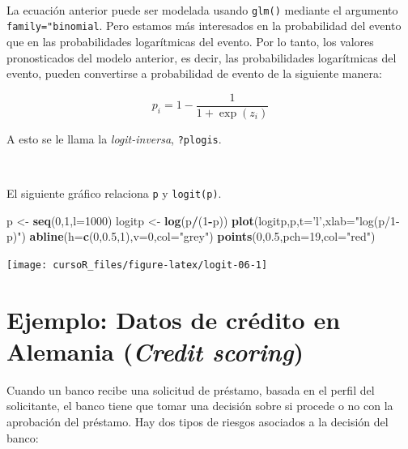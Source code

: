 \documentclass[]{book}
\newenvironment{Shaded}{\begin{snugshade}}{\end{snugshade}}
\newcommand{\KeywordTok}[1]{\textcolor[rgb]{0.13,0.29,0.53}{\textbf{#1}}}
\newcommand{\DataTypeTok}[1]{\textcolor[rgb]{0.13,0.29,0.53}{#1}}
\newcommand{\DecValTok}[1]{\textcolor[rgb]{0.00,0.00,0.81}{#1}}
\newcommand{\FloatTok}[1]{\textcolor[rgb]{0.00,0.00,0.81}{#1}}
\newcommand{\StringTok}[1]{\textcolor[rgb]{0.31,0.60,0.02}{#1}}
\newcommand{\OperatorTok}[1]{\textcolor[rgb]{0.81,0.36,0.00}{\textbf{#1}}}
\newcommand{\NormalTok}[1]{#1}
\begin{document}
~

La ecuación anterior puede ser modelada usando \texttt{glm()} mediante
el argumento \texttt{family="binomial}. Pero estamos más interesados en
la probabilidad del evento que en las probabilidades logarítmicas del
evento. Por lo tanto, los valores pronosticados del modelo anterior, es
decir, las probabilidades logarítmicas del evento, pueden convertirse a
probabilidad de evento de la siguiente manera:

\[
  p_i =1-\frac{1}{1 + \exp(z_i)}
\]

A esto se le llama la \emph{logit-inversa}, \texttt{?plogis}.

~

El siguiente gráfico relaciona \texttt{p} y \texttt{logit(p)}.

\begin{Shaded}
\begin{Highlighting}[]
\NormalTok{p <-}\StringTok{ }\KeywordTok{seq}\NormalTok{(}\DecValTok{0}\NormalTok{,}\DecValTok{1}\NormalTok{,}\DataTypeTok{l=}\DecValTok{1000}\NormalTok{)}
\NormalTok{logitp <-}\StringTok{ }\KeywordTok{log}\NormalTok{(p}\OperatorTok{/}\NormalTok{(}\DecValTok{1}\OperatorTok{-}\NormalTok{p))}
\KeywordTok{plot}\NormalTok{(logitp,p,}\DataTypeTok{t=}\StringTok{'l'}\NormalTok{,}\DataTypeTok{xlab=}\StringTok{"log(p/1-p)"}\NormalTok{)}
\KeywordTok{abline}\NormalTok{(}\DataTypeTok{h=}\KeywordTok{c}\NormalTok{(}\DecValTok{0}\NormalTok{,}\FloatTok{0.5}\NormalTok{,}\DecValTok{1}\NormalTok{),}\DataTypeTok{v=}\DecValTok{0}\NormalTok{,}\DataTypeTok{col=}\StringTok{"grey"}\NormalTok{)}
\KeywordTok{points}\NormalTok{(}\DecValTok{0}\NormalTok{,}\FloatTok{0.5}\NormalTok{,}\DataTypeTok{pch=}\DecValTok{19}\NormalTok{,}\DataTypeTok{col=}\StringTok{"red"}\NormalTok{)}
\end{Highlighting}
\end{Shaded}

\begin{center}\texttt{[image: cursoR\_files/figure-latex/logit-06-1]} \end{center}

\section{\texorpdfstring{Ejemplo: Datos de crédito en Alemania
(\emph{Credit
scoring})}{Ejemplo: Datos de crédito en Alemania (Credit scoring)}}\label{ejemplo-datos-de-cruxe9dito-en-alemania-credit-scoring}

Cuando un banco recibe una solicitud de préstamo, basada en el perfil
del solicitante, el banco tiene que tomar una decisión sobre si procede
o no con la aprobación del préstamo. Hay dos tipos de riesgos asociados
a la decisión del banco:
\end{document}
